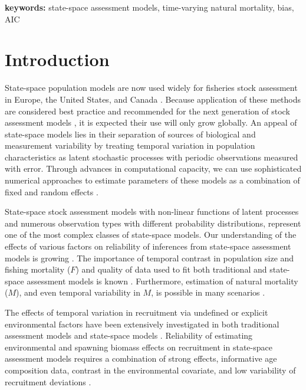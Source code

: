 \documentclass[
  12pt,
]{article}
\begin{document}
\textbf{keywords:} state-space assessment models, time-varying natural mortality, bias, AIC

\pagebreak

\section*{Introduction}\label{introduction}

State-space population models are now used widely for fisheries stock assessment in Europe, the United States, and Canada \citep{nielsenberg14, cadigan16, pedersenberg17, stockmiller21}. Because application of these methods are considered best practice and recommended for the next generation of stock assessment models \citep{hoyleetal22, punt23}, it is expected their use will only grow globally. An appeal of state-space models lies in their separation of sources of biological and measurement variability by treating temporal variation in population characteristics as latent stochastic processes with periodic observations measured with error. Through advances in computational capacity, we can use sophisticated numerical approaches to estimate parameters of these models as a combination of fixed and random effects \citep{thorsonminto15, kristensenetal16}.

State-space stock assessment models with non-linear functions of latent processes and numerous observation types with different probability distributions, represent one of the most complex classes of state-space models. Our understanding of the effects of various factors on reliability of inferences from state-space assessment models is growing \citep{lietal24, milleretal_inreview1}. The importance of temporal contrast in population size and fishing mortality (\(F\)) and quality of data used to fit both traditional and state-space assessment models is known \citep{magnussonhilborn07, milleretal_inreview1}. Furthermore, estimation of natural mortality (\(M\)), and even temporal variability in \(M\), is possible in many scenarios \citep{leeetal11, cadigan16, millerhyun18, milleretal_inreview1}.

The effects of temporal variation in recruitment via undefined or explicit environmental factors have been extensively investigated in both traditional assessment models and state-space models \citep{myers98, haltuchpunt11, johnsonetal16, milleretal16}. Reliability of estimating environmental and spawning biomass effects on recruitment in state-space assessment models requires a combination of strong effects, informative age composition data, contrast in the environmental covariate, and low variability of recruitment deviations \citep{brittenetal26, milleretal_inreview1}.
\end{document}
